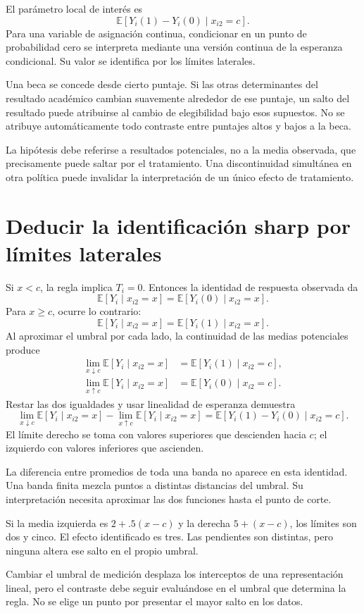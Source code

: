 \documentclass[11pt,a4paper]{article}
\newcommand{\E}{\mathbb E}
\begin{document}
El parámetro local de interés es
\[
\E[Y_i(1)-Y_i(0)\mid x_{i2}=c].
\]
Para una variable de asignación continua,
condicionar en un punto de probabilidad cero
se interpreta mediante una versión continua
de la esperanza condicional.
Su valor se identifica por los límites laterales.

\begin{ejemplo}
Una beca se concede desde cierto puntaje.
Si las otras determinantes del resultado académico
cambian suavemente alrededor de ese puntaje,
un salto del resultado puede atribuirse al
cambio de elegibilidad bajo esos supuestos.
No se atribuye automáticamente todo contraste
entre puntajes altos y bajos a la beca.
\end{ejemplo}
La hipótesis debe referirse a resultados potenciales,
no a la media observada, que precisamente
puede saltar por el tratamiento.
Una discontinuidad simultánea en otra política
puede invalidar la interpretación de un
único efecto de tratamiento.

\clearpage
\section{Deducir la identificación sharp por límites laterales}\label{unidad20}
Si \(x<c\), la regla implica \(T_i=0\).
Entonces la identidad de respuesta observada da
\[
\E[Y_i\mid x_{i2}=x]=\E[Y_i(0)\mid x_{i2}=x].
\]
Para \(x\ge c\), ocurre lo contrario:
\[
\E[Y_i\mid x_{i2}=x]=\E[Y_i(1)\mid x_{i2}=x].
\]
Al aproximar el umbral por cada lado,
la continuidad de las medias potenciales produce
\[
\begin{aligned}
\lim_{x\downarrow c}\E[Y_i\mid x_{i2}=x]
&=\E[Y_i(1)\mid x_{i2}=c],\\
\lim_{x\uparrow c}\E[Y_i\mid x_{i2}=x]
&=\E[Y_i(0)\mid x_{i2}=c].
\end{aligned}
\]
Restar las dos igualdades y usar linealidad
de esperanza demuestra
\[
\boxed{\lim_{x\downarrow c}\E[Y_i\mid x_{i2}=x]
-\lim_{x\uparrow c}\E[Y_i\mid x_{i2}=x]
=\E[Y_i(1)-Y_i(0)\mid x_{i2}=c]}.
\]
El límite derecho se toma con valores superiores
que descienden hacia \(c\); el izquierdo
con valores inferiores que ascienden.

La diferencia entre promedios de toda una banda
no aparece en esta identidad.
Una banda finita mezcla puntos a distintas
distancias del umbral.
Su interpretación necesita aproximar
las dos funciones hasta el punto de corte.

\begin{ejemplo}
Si la media izquierda es \(2+.5(x-c)\)
y la derecha \(5+(x-c)\), los límites son dos y cinco.
El efecto identificado es tres.
Las pendientes son distintas, pero ninguna
altera ese salto en el propio umbral.
\end{ejemplo}
Cambiar el umbral de medición desplaza los
interceptos de una representación lineal,
pero el contraste debe seguir evaluándose
en el umbral que determina la regla.
No se elige un punto por presentar
el mayor salto en los datos.
\end{document}
